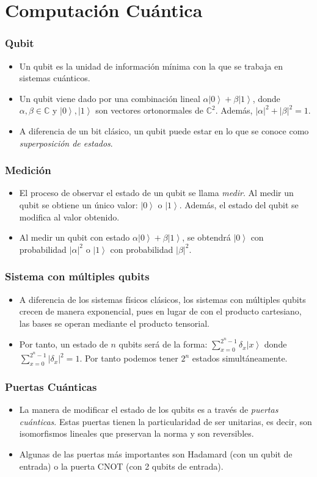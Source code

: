 \documentclass{beamer}
\newcommand{\C}{\mathbb{C}} %
\newcommand{\ket}[1]{\left|#1\right\rangle}
\begin{document}
\section{Computación Cuántica}
\begin{frame}
	\frametitle{Qubit}
	\begin{itemize}
		\item Un qubit es la unidad de información mínima con la que se trabaja en sistemas cuánticos.
		\item Un qubit viene dado por una combinación lineal $\alpha\ket0 + \beta\ket1$, donde $\alpha,\beta\in\C$ y $\ket0, \ket1$ son vectores ortonormales de $\C^2$. Además, $ |\alpha|^2 + |\beta|^2 = 1$.
		\item A diferencia de un bit clásico, un qubit puede estar en lo que se conoce como \textit{superposición de estados}.
	\end{itemize}
\end{frame}
\begin{frame}
	\frametitle{Medición}
	\begin{itemize}
		\item El proceso de observar el estado de un qubit se llama \textit{medir}. Al medir un qubit se obtiene un único valor: $\ket0$ o $\ket1$. Además, el estado del qubit se modifica al valor obtenido.
		\item Al medir un qubit con estado $\alpha\ket0 + \beta\ket1$, se obtendrá $\ket0$ con probabilidad $|\alpha|^2$ o $\ket1$ con probabilidad $|\beta|^2$.
	\end{itemize}
\end{frame}
\begin{frame}
	\frametitle{Sistema con múltiples qubits}
	\begin{itemize}
		\item A diferencia de los sistemas físicos clásicos, los sistemas con múltiples qubits crecen de manera exponencial, pues en lugar de con el producto cartesiano, las bases se operan mediante el producto tensorial.
		\item Por tanto, un estado de $n$ qubits será de la forma: $\sum_{x=0}^{2^n-1}\delta_x\ket{x}$ donde $\sum_{x=0}^{2^n-1}|\delta_x|^2 = 1$. Por tanto podemos tener $2^n$ estados simultáneamente.
	\end{itemize}
\end{frame}	
\begin{frame}
	\frametitle{Puertas Cuánticas}
	\begin{itemize}
		\item La manera de modificar el estado de los qubits es a través de \textit{puertas cuánticas}. Estas puertas tienen la particularidad de ser unitarias, es decir, son isomorfismos lineales que preservan la norma y son reversibles.
		\item Algunas de las puertas más importantes son Hadamard (con un qubit de entrada) o la puerta CNOT (con 2 qubits de entrada). 
	\end{itemize}
\end{frame}	
\end{document}
